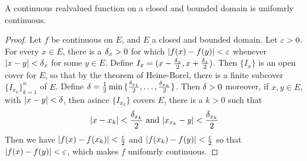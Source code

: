 \begin{theorem}\label{1.3.6}
    A continuous realvalued function on a closed and bounded domain is unifomrly
    continuous.
\end{theorem}
\begin{proof}
    Let $f$ be continuous on  $E$, and  $E$ a closed and bounded domain. Let
    $\varepsilon>0$. For every  $x \in E$, there is a  $\delta_x>0$ for which
    $|f(x)-f(y)|<\varepsilon$ whenever $|x-y|<\delta_x$ for some $y \in E$. Define
    $I_x=(x-\frac{\delta_x}{2}, x+\frac{\delta_x}{2})$. Then $\{I_x\}$ is an open
    cover for $E$, so that by the theorem of Heine-Borel, there is a finite
    subcover  $\{I_{x_k}\}_{k=1}^n$ of $E$. Define  $\delta=
    \frac{1}{2}\min{\{\frac{\delta_{x_1}}{2}, \dots, \frac{\delta_{x_n}}{2}\}}$. Then
    $\delta>0$ moreover, if $x,y \in E$, with $|x-y|<\delta$, then asince
    $\{I_{x_k}\}$ covers $E$, there is a  $k>0$ such that
    \begin{equation*}
        |x-x_k|<\frac{\delta_{x_k}}{2} \text{ and } |x_{x_k}-y|<\frac{\delta_{x_k}}{2}
    \end{equation*}
    Then we have $|f(x)-f(x_k)|<\frac{\varepsilon}{2}$ and $|f(x_k)-f(y)|<\frac{\varepsilon}{2}$
    so that $|f(x)-f(y)|<\varepsilon$, which makes $f$ unifomrly continuous.
\end{proof}
